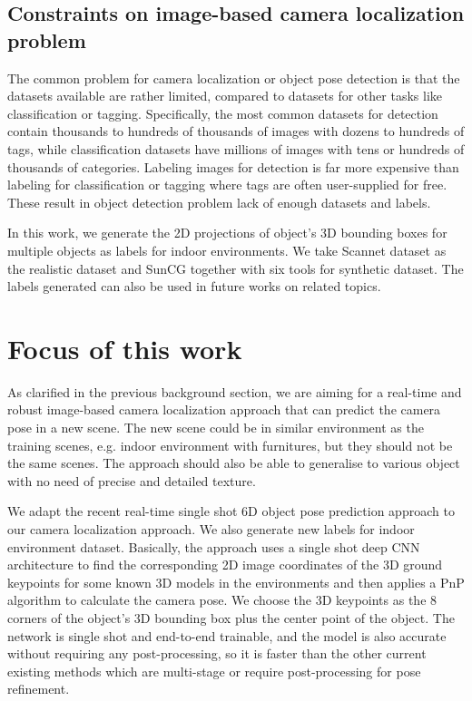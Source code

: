 \subsection{Constraints on image-based camera localization problem}

The common problem for camera localization or object pose detection is that the datasets available are rather limited, compared to datasets for other tasks like classification or tagging. Specifically, the most common datasets for detection contain thousands to hundreds of thousands of images with dozens to hundreds of tags, while classification datasets have millions of images with tens or hundreds of thousands of categories. Labeling images for detection is far more expensive than labeling for classification or tagging where tags are often user-supplied for free. These result in object detection problem lack of enough datasets and labels.

In this work, we generate the 2D projections of object's 3D bounding boxes for multiple objects as labels for indoor environments. We take Scannet dataset as the realistic dataset and SunCG together with six tools for synthetic dataset. The labels generated can also be used in future works on related topics.


\section{Focus of this work}

As clarified in the previous background section, we are aiming for a real-time and robust image-based camera localization approach that can predict the camera pose in a new scene. The new scene could be in similar environment as the training scenes, e.g. indoor environment with furnitures, but they should not be the same scenes. The approach should also be able to generalise to various object with no need of precise and detailed texture.

We adapt the recent real-time single shot 6D object pose prediction approach \cite{tekin2018real} to our camera localization approach. We also generate new labels for indoor environment dataset. Basically, the approach uses a single shot deep CNN architecture to find the corresponding 2D image coordinates of the 3D ground keypoints for some known 3D models in the environments and then applies a PnP algorithm to calculate the camera pose. We choose the 3D keypoints as the 8 corners of the object's 3D bounding box plus the center point of the object. The network is single shot and end-to-end trainable, and the model is also accurate without requiring any post-processing, so it is faster than the other current existing methods which are multi-stage or require post-processing for pose refinement.